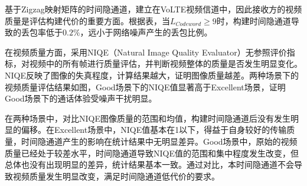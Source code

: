 
基于Zigzag映射矩阵的时间隐通道，建立在VoLTE视频信道中，因此接收方的视频质量是评估构建代价的重要方面。根据表，当$L_{Codeword}\ge 9$时，构建时间隐通道导致的丢包率低于$0.2\%$，远小于网络噪声产生的丢包比例。

在视频质量方面，采用NIQE（Natural Image Quality Evaluator）无参照评价指标，对视频中的所有帧进行质量评估，并判断视频整体的质量是否发生明显变化。NIQE反映了图像的失真程度，计算结果越大，证明图像质量越差。两种场景下的视频质量评估结果如图，Good场景下的NIQE值显著高于Excellent场景，证明Good场景下的通话体验受噪声干扰明显。

在两种场景中，对比NIQE图像质量的范围和均值，构建时间隐通道后没有发生明显的偏移。在Excellent场景中，NIQE值基本在1以下，得益于自身较好的传输质量，时间隐通道产生的影响在统计结果中无明显差异。Good场景中，原始的视频质量已经处于较差水平，时间隐通道导致NIQE值的范围和集中程度发生改变，但总体也没有出现明显的差异，统计结果基本一致。通过对比，本时间隐通道不会导致视频质量发生明显改变，满足时间隐通道低代价的要求。

